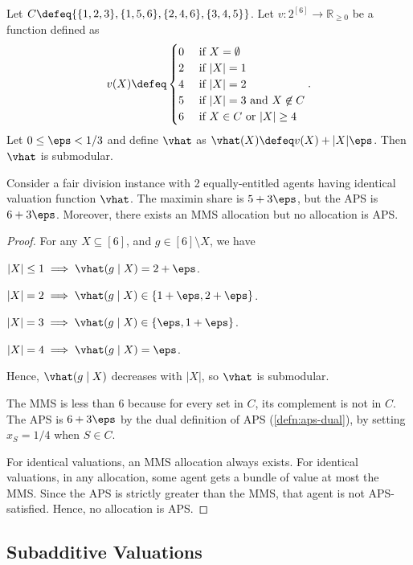 \begin{lemma}[MMS $\nfimplies$ APS for $n=2$, Remark 2 of \cite{babaioff2023fair}]
\label{cex:mms-not-aps-n2-submod}
Let $C \defeq \{\{1, 2, 3\}, \{1, 5, 6\}, \{2, 4, 6\}, \{3, 4, 5\}\}$.
Let $v: 2^{[6]} \to \mathbb{R}_{\ge 0}$ be a function defined as
\[ v(X) \defeq \begin{cases}
0 & \text{ if } X = \emptyset
\\ 2 & \text{ if } |X| = 1
\\ 4 & \text{ if } |X| = 2
\\ 5 & \text{ if } |X| = 3 \text{ and } X \not\in C
\\ 6 & \text{ if } X \in C \text{ or } |X| \ge 4
\end{cases}. \]
Let $0 \le \eps < 1/3$ and define $\vhat$ as $\vhat(X) \defeq v(X) + |X|\eps$.
Then $\vhat$ is submodular.

Consider a fair division instance with 2 equally-entitled agents
having identical valuation function $\vhat$.
The maximin share is $5 + 3\eps$, but the APS is $6 + 3\eps$.
Moreover, there exists an MMS allocation but no allocation is APS.
\end{lemma}
\begin{proof}
For any $X \subseteq [6]$, and $g \in [6] \setminus X$, we have
\begin{tightenum}
\item $|X| \le 1 \implies \vhat(g \mid X) = 2 + \eps$.
\item $|X| = 2 \implies \vhat(g \mid X) \in \{1 + \eps, 2 + \eps\}$.
\item $|X| = 3 \implies \vhat(g \mid X) \in \{\eps, 1 + \eps\}$.
\item $|X| = 4 \implies \vhat(g \mid X) = \eps$.
\end{tightenum}
Hence, $\vhat(g \mid X)$ decreases with $|X|$, so $\vhat$ is submodular.

The MMS is less than 6 because for every set in $C$,
its complement is not in $C$.
The APS is $6 + 3\eps$ by the dual definition of APS (\cref{defn:aps-dual}),
by setting $x_S = 1/4$ when $S \in C$.

For identical valuations, an MMS allocation always exists.
For identical valuations, in any allocation, some agent gets a bundle of value at most the MMS.
Since the APS is strictly greater than the MMS, that agent is not APS-satisfied.
Hence, no allocation is APS.
\end{proof}

\subsection{Subadditive Valuations}
\label{sec:cex-extra:subadd}

